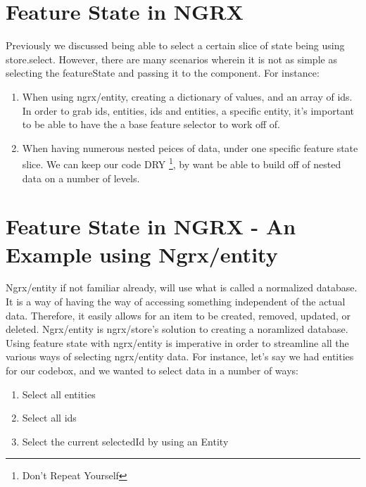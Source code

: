 \section{ Feature State in NGRX }
Previously we discussed being able to select a certain slice of state being
using store.select. However, there are many scenarios wherein it is not
as simple as selecting the featureState and passing it to the component. For
instance:
\begin{enumerate}
  \item When using ngrx/entity, creating a dictionary of values, and an array
  of ids. In order to grab ids, entities, ids and entities, a specific entity,
  it's important to be able to have the a base feature selector to work off of.
  \item When having numerous nested peices of data, under one specific feature
  state slice. We can keep our code DRY \footnote{Don't Repeat Yourself}, by
  want be able to build off of nested data on a number of levels.
\end{enumerate}


\section{ Feature State in NGRX - An Example using Ngrx/entity}

Ngrx/entity if not familiar already, will use what is called a normalized
database. It is a way of having the way of accessing something independent of
the actual data. Therefore, it easily allows for an item to be created, removed,
updated, or deleted. Ngrx/entity is ngrx/store's solution to creating a
noramlized database. Using feature state with ngrx/entity is imperative in order
to streamline all the various ways of selecting ngrx/entity data. For instance,
let's say we had entities for our codebox, and we wanted to select data in a
number of ways:

\begin{enumerate}
  \item Select all entities
  \item Select all ids
  \item Select the current selectedId by using an Entity
\end{enumerate}


